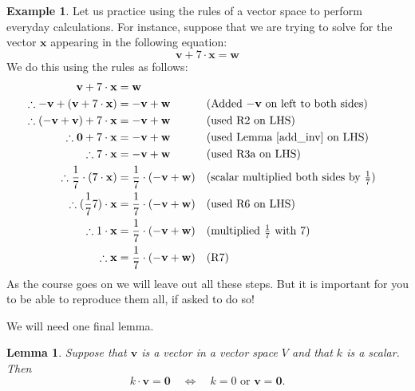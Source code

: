 \documentclass[a4paper,11pt]{book}
\newtheorem{lemma}[theorem]{Lemma}
\theoremstyle{definition}
\newtheorem{example_environment}{Example}[chapter]
\newcommand{\be}{\begin{equation}}
\newcommand{\ee}{\end{equation}}
\newcommand{\ve}[1]{\mathbf{#1}}
\newenvironment{example}
	{
		\begin{oframed} 
		\begin{example_environment}
	}
	{
		\end{example_environment}
		\end{oframed}
	}
\begin{document}
\begin{example} \label{explicit_solve_x} Let us practice using the rules of a vector space to perform everyday calculations. For instance, suppose that we are trying to solve for the vector $\ve{x}$ appearing in the following equation:
\be
 \ve{v} + 7 \cdot \ve{x} = \ve{w}
\ee
We do this using the rules as follows:
\begin{align*}
	 \ve{v} + 7 \cdot \ve{x} & = \ve{w} \\
	\therefore  -\ve{v} + (\ve{v} + 7 \cdot \ve{x}) & = -\ve{v} + \ve{w} && \mbox{(Added $-\ve{v}$ on left to both sides)} \\
	\therefore  (-\ve{v} + \ve{v}) + 7 \cdot \ve{x} & = -\ve{v} + \ve{w} && \mbox{(used R2 on LHS)} \\
	\therefore  \ve{0} + 7 \cdot \ve{x} & = -\ve{v} + \ve{w} && \mbox{(used Lemma \ref{add_inv} on LHS)} \\
	\therefore  7 \cdot \ve{x} & =  -\ve{v} + \ve{w} && \mbox{(used R3a on LHS)} \\
	\therefore  \frac{1}{7} \cdot (7 \cdot \ve{x}) & = \frac{1}{7} \cdot (-\ve{v} + \ve{w}) && \mbox{(scalar multiplied both sides by $\frac{1}{7}$)} \\
	\therefore  (\frac{1}{7} 7) \cdot 	\ve{x} & = \frac{1}{7} \cdot (-\ve{v} + \ve{w}) && \mbox{(used R6 on LHS)} \\
	\therefore  1 \cdot \ve{x} & =  \frac{1}{7} \cdot (-\ve{v} + \ve{w})  && \mbox{(multiplied $\frac{1}{7}$ with $7$)} \\
	\therefore  \ve{x} & =  \frac{1}{7} \cdot (-\ve{v} + \ve{w}) && \mbox{(R7)} 
\end{align*}
As the course goes on we will leave out all these steps. But it is important for you to be able to reproduce them all, if asked to do so!
\end{example}
We will need one final lemma.
\begin{lemma} \label{dichotomy_lem} Suppose that $\ve{v}$ is a vector in a vector space $V$ and that $k$ is a scalar. Then
\[
 k \cdot \ve{v} = \ve{0} \quad \Leftrightarrow \quad k = 0 \mbox{ or } \ve{v} = \ve{0}.
\]
\end{lemma}
\end{document}
